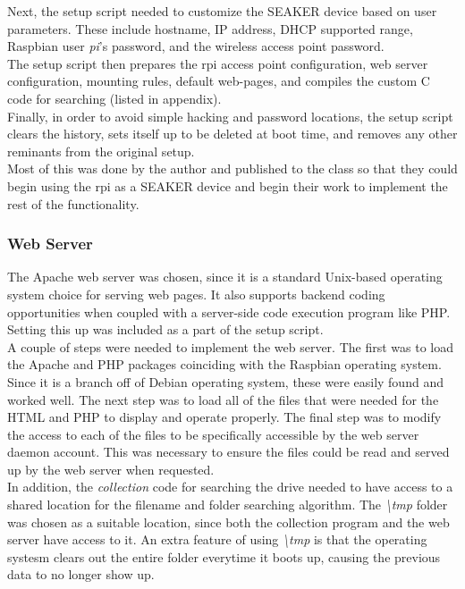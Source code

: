 \documentclass[12pt]{article}
\begin{document}
Next, the setup script needed to customize the SEAKER device based on user
parameters.  These include hostname, IP address, DHCP supported range, Raspbian
user {\em pi}'s password, and the wireless access point password.\\

The setup script then prepares the \gls{rpi} access point configuration, web server
configuration, mounting rules, default web-pages, and compiles the custom C code
for searching (listed in appendix).\\

Finally, in order to avoid simple hacking and password locations, the setup
script clears the history, sets itself up to be deleted at boot time, and removes
any other reminants from the original setup.\\

Most of this was done by the author and published to the class so that they could
begin using the \gls{rpi} as a SEAKER device and begin their work to implement the
rest of the functionality.

\subsubsection{Web Server}

The Apache web server was chosen, since it is a standard Unix-based operating system
choice for serving web pages.  It also supports backend coding opportunities when 
coupled with a server-side code execution program like PHP.  Setting this up was
included as a part of the setup script.\\

A couple of steps were needed to implement the web server.  The first was to
load the Apache and PHP packages coinciding with the Raspbian operating system.  
Since it is a branch off of Debian operating system, these were easily found and
worked well.  The next step was to load all of the files that were needed for
the HTML and PHP to display and operate properly.  The final step was to modify
the access to each of the files to be specifically accessible by the web
server daemon account.  This was necessary to ensure the files could be read and
served up by the web server when requested.\\

In addition, the {\em collection} code for searching the drive needed to have 
access to a shared location for the filename and folder searching algorithm.
The {\em \textbackslash{}tmp} folder was chosen as a suitable location, since
both the collection program and the web server have access to it.  An extra
feature of using {\em \textbackslash{}tmp} is that the operating systesm clears
out the entire folder everytime it boots up, causing the previous data to no
longer show up.\\
\end{document}

